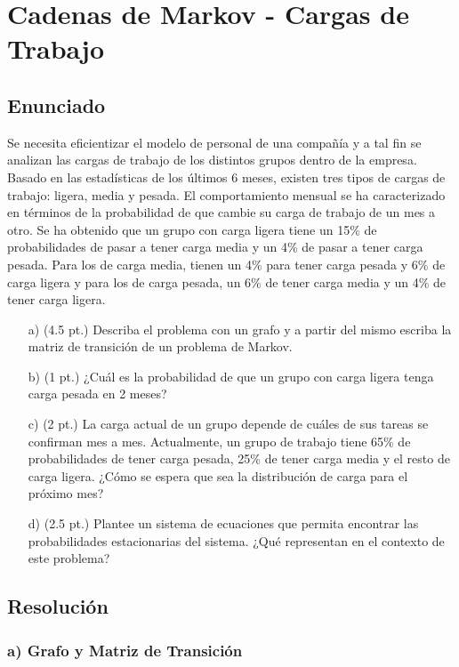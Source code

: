 \documentclass[12pt]{article}
\begin{document}
\section{Cadenas de Markov - Cargas de Trabajo}

\subsection{Enunciado}
Se necesita eficientizar el modelo de personal de una compañía y a tal fin se analizan las cargas de trabajo de los distintos grupos dentro de la empresa. Basado en las estadísticas de los últimos 6 meses, existen tres tipos de cargas de trabajo: ligera, media y pesada. El comportamiento mensual se ha caracterizado en términos de la probabilidad de que cambie su carga de trabajo de un mes a otro. Se ha obtenido que un grupo con carga ligera tiene un 15\% de probabilidades de pasar a tener carga media y un 4\% de pasar a tener carga pesada. Para los de carga media, tienen un 4\% para tener carga pesada y 6\% de carga ligera y para los de carga pesada, un 6\% de tener carga media y un 4\% de tener carga ligera.

\begin{itemize}
    \item[a)] (4.5 pt.) Describa el problema con un grafo y a partir del mismo escriba la matriz de transición de un problema de Markov.
    \item[b)] (1 pt.) ¿Cuál es la probabilidad de que un grupo con carga ligera tenga carga pesada en 2 meses?
    \item[c)] (2 pt.) La carga actual de un grupo depende de cuáles de sus tareas se confirman mes a mes. Actualmente, un grupo de trabajo tiene 65\% de probabilidades de tener carga pesada, 25\% de tener carga media y el resto de carga ligera. ¿Cómo se espera que sea la distribución de carga para el próximo mes?
    \item[d)] (2.5 pt.) Plantee un sistema de ecuaciones que permita encontrar las probabilidades estacionarias del sistema. ¿Qué representan en el contexto de este problema?
\end{itemize}

\subsection{Resolución}

\subsubsection{a) Grafo y Matriz de Transición}
\end{document}
